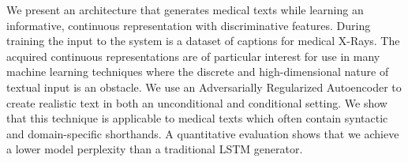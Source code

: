We present an architecture that generates medical texts while learning an informative, continuous representation with discriminative features. During training the input to the system is a dataset of captions for medical X-Rays. The acquired continuous representations are of particular interest for use in many machine learning techniques where the discrete and high-dimensional nature of textual input is an obstacle. We use an Adversarially Regularized Autoencoder to create realistic text in both an unconditional and conditional setting. We show that this technique is applicable to medical texts which often contain syntactic and domain-specific shorthands. A quantitative evaluation shows that we achieve a lower model perplexity than a traditional LSTM generator.
